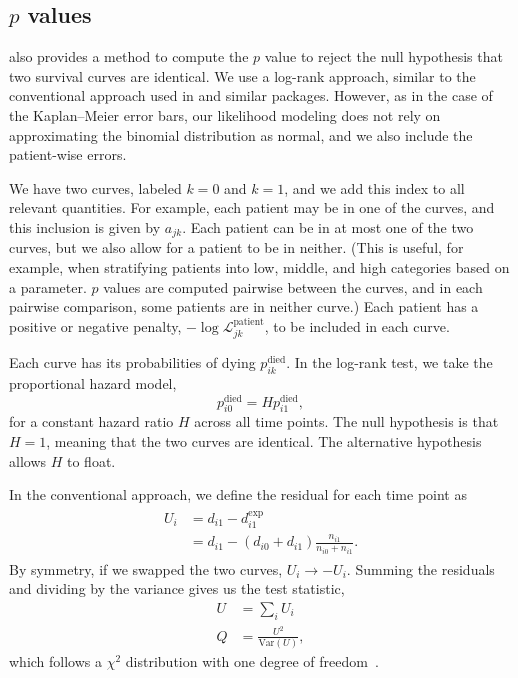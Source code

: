 \documentclass[article]{jss}
\newcommand{\KM}{Kaplan--Meier} %
\begin{document}
\subsection[p values]{\(p\) values}

 also provides a method to compute the \(p\) value to reject the null hypothesis that two survival curves are identical. We use a log-rank approach, similar to the conventional approach used in  and similar packages. However, as in the case of the \KM{} error bars, our likelihood modeling does not rely on approximating the binomial distribution as normal, and we also include the patient-wise errors.

We have two curves, labeled \(k=0\) and \(k=1\), and we add this index to all relevant quantities. For example, each patient may be in one of the curves, and this inclusion is given by \(a_{jk}\). Each patient can be in at most one of the two curves, but we also allow for a patient to be in neither. (This is useful, for example, when stratifying patients into low, middle, and high categories based on a parameter\@. \(p\) values are computed pairwise between the curves, and in each pairwise comparison, some patients are in neither curve.)  Each patient has a positive or negative penalty, \(-\log\mathcal{L}_{jk}^\text{patient}\), to be included in each curve.

Each curve has its probabilities of dying \(p^\text{died}_{ik}\). In the log-rank test, we take the proportional hazard model,
\begin{equation}
p^\text{died}_{i0} = H p^\text{died}_{i1},
\label{eq:logrank-hazard}
\end{equation}
for a constant hazard ratio \(H\) across all time points. The null hypothesis is that \(H=1\), meaning that the two curves are identical. The alternative hypothesis allows \(H\) to float.

In the conventional approach, we define the residual for each time point as
\begin{align}
\begin{aligned}
U_i&=d_{i1} - d_{i1}^\text{exp} \\
&=d_{i1} - (d_{i0} + d_{i1})\frac{n_{i1}}{n_{i0}+n_{i1}}.
\end{aligned}
\end{align}
By symmetry, if we swapped the two curves, \(U_i\rightarrow-U_i\). Summing the residuals and dividing by the variance gives us the test statistic,
\begin{align}
U&=\sum_i U_i \\
Q&=\frac{U^2}{\text{Var}(U)},
\end{align}
which follows a \(\chi^2\) distribution with one degree of freedom~\citep[pp.~45--47]{mantel1966evaluation,peto1972asymptotically,appliedsurvivalanalysis}.
\end{document}
